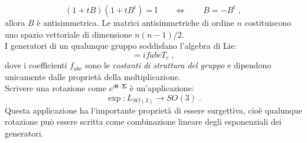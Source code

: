 \documentclass[12pt,a4paper]{report}
\theoremstyle{definition}
\numberwithin{equation}{section}
\begin{document}
$$
(1+tB)(1+tB^t)=\mathbb{I}\qquad \Longleftrightarrow \qquad B=-B^t\;,
$$
allora $B$ è antisimmetrica. Le matrici antisimmetriche di ordine $n$ costituiscono uno spazio vettoriale di dimensione $n(n-1)/2$. \\
I generatori di un qualunque gruppo soddisfano l'algebra di Lie:
\begin{equation}
[T_a,T_b]=if{abc}T_c\;,
\end{equation}
dove i coefficienti $f_{abc}$ sono le \textit{costanti di struttura del gruppo} e dipendono unicamente dalle proprietà della moltiplicazione. \\
Scrivere una rotazione come $e^{i\boldsymbol{\theta}\cdot \boldsymbol{\Sigma}}$ è un'applicazione:
\begin{equation}
\exp: L_{SO(3)} \longrightarrow SO(3)\;.
\end{equation}
Questa applicazione ha l'importante proprietà di essere surgettiva, cioè qualunque rotazione può essere scritta come combinazione lineare degli esponenziali dei generatori.
\end{document}
